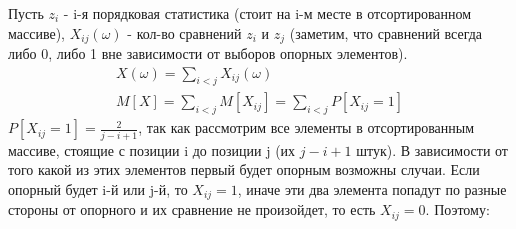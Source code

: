 \noindent Пусть $z_i$ - i-я порядковая статистика (стоит на i-м месте в отсортированном массиве), $X_{ij} (\omega)$ - кол-во сравнений $z_i$ и $z_j$ (заметим, что сравнений всегда либо 0, либо 1 вне зависимости от выборов опорных элементов). \\ 
\begin{equation*}
\begin{array}{c}
X(\omega) = \sum\limits_{i<j} X_{ij}(\omega) \\
M[X] = \sum\limits_{i<j} M[X_{ij}] = \sum\limits_{i<j} P[X_{ij} = 1]
\end{array}
\end{equation*}
$P[X_{ij} = 1] = \frac{2}{j - i + 1}$, так как рассмотрим все элементы в отсортированным массиве, стоящие с позиции i до позиции j (их $j - i + 1$ штук). В зависимости от того какой из этих элементов первый будет опорным возможны случаи. Если опорный будет i-й или j-й, то $X_{ij} = 1$, иначе эти два элемента попадут по разные стороны от опорного и их сравнение не произойдет, то есть $X_{ij} = 0$. Поэтому:
